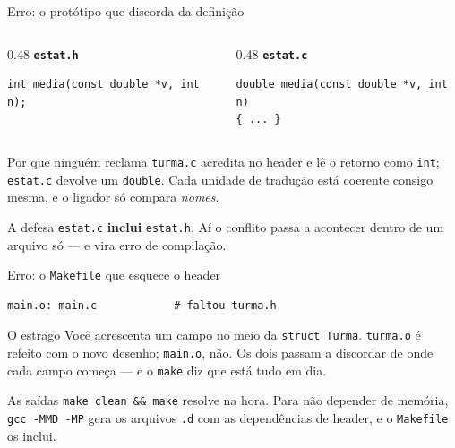 \documentclass[aspectratio=169]{beamer}
\begin{document}
\begin{frame}[fragile]{Erro: o protótipo que discorda da definição}
  \begin{columns}[T]
    \begin{column}{0.48\textwidth}
      \textbf{\texttt{estat.h}}
\begin{lstlisting}[basicstyle=\ttfamily\tiny, numbers=none]
int media(const double *v, int n);
\end{lstlisting}
    \end{column}
    \begin{column}{0.48\textwidth}
      \textbf{\texttt{estat.c}}
\begin{lstlisting}[basicstyle=\ttfamily\tiny, numbers=none]
double media(const double *v, int n)
{ ... }
\end{lstlisting}
    \end{column}
  \end{columns}
  \begin{block}{Por que ninguém reclama}
    \small \texttt{turma.c} acredita no header e lê o retorno como
    \texttt{int}; \texttt{estat.c} devolve um \texttt{double}. Cada unidade de
    tradução está coerente consigo mesma, e o ligador só compara \emph{nomes}.
  \end{block}
  \begin{alertblock}{A defesa}
    \small \texttt{estat.c} \textbf{inclui} \texttt{estat.h}. Aí o conflito
    passa a acontecer dentro de um arquivo só --- e vira erro de compilação.
  \end{alertblock}
\end{frame}

\begin{frame}[fragile]{Erro: o \texttt{Makefile} que esquece o header}
\begin{lstlisting}[style=makeStyle]
main.o: main.c            # faltou turma.h
\end{lstlisting}
  \begin{block}{O estrago}
    \small Você acrescenta um campo no meio da \texttt{struct Turma}.
    \texttt{turma.o} é refeito com o novo desenho; \texttt{main.o}, não.
    Os dois passam a discordar de onde cada campo começa --- e o
    \texttt{make} diz que está tudo em dia.
  \end{block}
  \begin{block}{As saídas}
    \small \texttt{make clean \&\& make} resolve na hora. Para não depender de
    memória, \texttt{gcc -MMD -MP} gera os arquivos \texttt{.d} com as
    dependências de header, e o \texttt{Makefile} os inclui.
  \end{block}
\end{frame}
\end{document}
